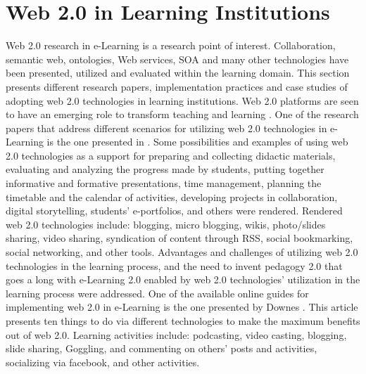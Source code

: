 \documentclass[12pt,a4paper,final,twoside,onecolumn,titlepage]{book}
\begin{document}
\section{Web 2.0 in Learning Institutions}
Web 2.0 research in e-Learning is a research point of interest. Collaboration, semantic web, ontologies, Web services, \gls{SOA} and many other technologies have been presented, utilized and evaluated within the learning domain. This section presents different research papers, implementation practices and case studies of adopting web 2.0 technologies in learning institutions. Web 2.0 platforms are seen to have an emerging role to transform teaching and learning \cite{W07}. One of the research papers that address different scenarios for utilizing web 2.0 technologies in e-Learning is the one presented in \cite{W03}. Some possibilities and examples of using web 2.0 technologies as a support for preparing and collecting didactic materials, evaluating and analyzing the progress made by students, putting together informative and formative presentations, time management, planning the timetable and the calendar of activities, developing projects in collaboration, digital storytelling, students’ e-portfolios, and others were rendered. Rendered web 2.0 technologies include: blogging, micro blogging, wikis, photo/slides sharing, video sharing, syndication of content through RSS, social bookmarking, social networking, and other tools. Advantages and challenges of utilizing web 2.0 technologies in the learning process, and the need to invent pedagogy 2.0 that goes a long with e-Learning 2.0 enabled by web 2.0 technologies’ utilization in the learning process were addressed.
One of the available online guides for implementing web 2.0 in e-Learning is the one presented by Downes \cite{W08}. This article presents ten things to do via different technologies to make the maximum benefits out of web 2.0. Learning activities include: podcasting, video casting, blogging, slide sharing, Goggling, and commenting on others' posts and activities, socializing via facebook, and other activities.
\end{document}
